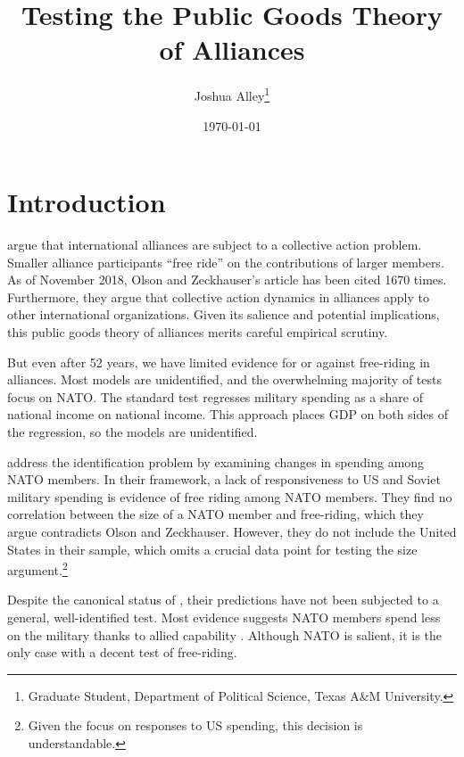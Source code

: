 \documentclass[12pt]{article}
\title{
\textbf{Testing the Public Goods Theory of Alliances}
	}
\author{Joshua Alley\footnote{Graduate Student,
Department of Political Science, Texas A\&M University.}}
\date{{\normalsize \today}}
\begin{document}
\maketitle 

\doublespace



\section{Introduction}



\citet{OlsonZeckhauser1966} argue that international alliances are subject to a collective action problem. 
Smaller alliance participants ``free ride'' on the contributions of larger members. 
As of November 2018, Olson and Zeckhauser's article has been cited 1670 times.
Furthermore, they argue that collective action dynamics in alliances apply to other international organizations. 
Given its salience and potential implications, this public goods theory of alliances merits careful empirical scrutiny. 


But even after 52 years, we have limited evidence for or against free-riding in alliances. 
Most models are unidentified, and the overwhelming majority of tests focus on NATO. 
The standard test regresses military spending as a share of national income on national income. 
This approach places GDP on both sides of the regression, so the models are unidentified. 


\citet{PluemperNeumayer2015} address the identification problem by examining changes in spending among NATO members. 
In their framework, a lack of responsiveness to US and Soviet military spending is evidence of free riding among NATO members.
They find no correlation between the size of a NATO member and free-riding, which they argue contradicts Olson and Zeckhauser. 
However, they do not include the United States in their sample, which omits a crucial data point for testing the size argument.\footnote{Given the focus on responses to US spending, this decision is understandable.}


Despite the canonical status of \citet{OlsonZeckhauser1966}, their predictions have not been subjected to a general, well-identified test. 
Most evidence suggests NATO members spend less on the military thanks to allied capability \citep{PluemperNeumayer2015, GeorgeSandler2017}.
Although NATO is salient, it is the only case with a decent test of free-riding. 
\end{document}
